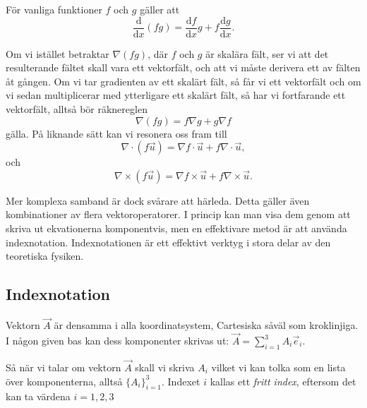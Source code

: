 \documentclass[%
oneside,                 %
final,                   %
10pt]{article}
\begin{document}
För vanliga funktioner $f$ och $g$ gäller att
\begin{equation}
  \frac{\mbox{d}}{\mbox{d}x}\left(fg\right) = \frac{\mbox{d}f}{\mbox{d}x}g
+ f\frac{\mbox{d}g}{\mbox{d}x}.
\end{equation}

Om vi istället betraktar $\nabla (fg)$, där $f$ och $g$ är skalära fält, ser vi att det resulterande fältet skall vara ett vektorfält, och att vi måste derivera ett av fälten åt gången. Om vi tar gradienten av ett skalärt fält, så får vi ett vektorfält och om vi sedan multiplicerar med ytterligare ett skalärt fält, så har vi fortfarande ett vektorfält, alltså bör räknereglen
\begin{equation}
  \nabla \left(fg\right) = f \nabla g + g\nabla f
\end{equation}
gälla. På liknande sätt kan vi resonera oss fram till
\begin{equation}
  \nabla \cdot \left(f\vec{u}\right) = \nabla f \cdot \vec{u} + f \nabla \cdot \vec{u},
\end{equation}
och
\begin{equation}
  \nabla \times \left(f\vec{u}\right) = \nabla f\times \vec{u} + f \nabla \times \vec{u}.
\end{equation}

Mer komplexa samband är dock svårare att härleda. Detta gäller även kombinationer av flera vektoroperatorer. I princip kan man visa dem genom att skriva ut ekvationerna komponentvis, men en effektivare metod är att använda indexnotation. Indexnotationen är ett effektivt verktyg i stora delar av den teoretiska fysiken.

\subsection{Indexnotation}

Vektorn $\vec{A}$ är densamma i alla koordinatsystem, Cartesiska såväl som kroklinjiga. I någon given bas kan dess komponenter skrivas ut: $\vec{A}=\sum_{i=1}^3A_i\vec{e}_i$. 

Så när vi talar om vektorn $\vec{A}$ skall vi skriva $A_i$ vilket vi kan tolka som en lista över komponenterna, alltså $\{A_i\}_{i=1}^3$. Indexet $i$ kallas ett \emph{fritt index}, eftersom det kan ta värdena $i=1,2,3$ 
\end{document}
